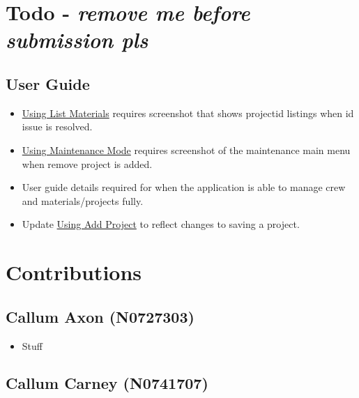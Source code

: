 \documentclass[
  english,
  a4paper,
,tablecaptionabove
]{scrartcl}
\providecommand{\tightlist}{%
  \setlength{\itemsep}{0pt}\setlength{\parskip}{0pt}}
\begin{document}
\newpage

\hypertarget{todo---remove-me-before-submission-pls}{%
\section{\texorpdfstring{Todo - \textbf{\emph{remove me before
submission
pls}}}{Todo - remove me before submission pls}}\label{todo---remove-me-before-submission-pls}}

\hypertarget{user-guide}{%
\subsection{User Guide}\label{user-guide}}

\begin{itemize}
\tightlist
\item
  \protect\hyperlink{using-list-materials}{Using List Materials}
  requires screenshot that shows projectid listings when id issue is
  resolved.
\item
  \protect\hyperlink{using-maintenance-mode}{Using Maintenance Mode}
  requires screenshot of the maintenance main menu when remove project
  is added.
\item
  User guide details required for when the application is able to manage
  crew and materials/projects fully.
\item
  Update \protect\hyperlink{using-add-project}{Using Add Project} to
  reflect changes to saving a project.
\end{itemize}

\newpage

\hypertarget{contributions}{%
\section{Contributions}\label{contributions}}

\hypertarget{callum-axon-n0727303}{%
\subsection{Callum Axon (N0727303)}\label{callum-axon-n0727303}}

\begin{itemize}
\tightlist
\item
  Stuff
\end{itemize}

\hypertarget{callum-carney-n0741707}{%
\subsection{Callum Carney (N0741707)}\label{callum-carney-n0741707}}
\end{document}
